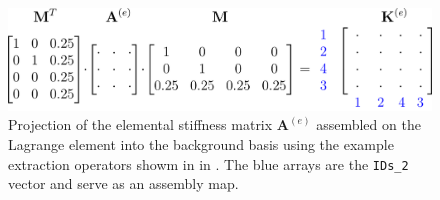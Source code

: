 \begin{figure}[h]
    \begin{center}
    \includegraphics[width=12cm]{Figures/assembly.png}
    \caption{Projection of the elemental stiffness matrix $\bm{A}^{(e)}$ assembled on the Lagrange element into the background basis using the example extraction operators showm in in . The blue arrays are the \texttt{IDs\_2} vector and serve as an assembly map.} 
    \label{fig:assembly}
    \end{center}
\end{figure}



